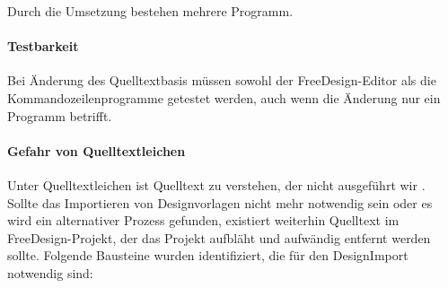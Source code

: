 Durch die Umsetzung bestehen mehrere Programm.
\paragraph{Testbarkeit} 
Bei Änderung des Quelltextbasis müssen sowohl der FreeDesign-Editor als die Kommandozeilenprogramme getestet werden, auch wenn die Änderung nur ein Programm betrifft.
\paragraph{Gefahr von Quelltextleichen}
Unter Quelltextleichen ist Quelltext zu verstehen, der nicht ausgeführt wir \autocite[vgl.][292]{Martin2009}. Sollte das Importieren von Designvorlagen nicht mehr notwendig sein oder es wird ein alternativer Prozess gefunden, existiert weiterhin Quelltext im FreeDesign-Projekt, der das Projekt aufbläht und aufwändig entfernt werden sollte.
\newline
Folgende Bausteine wurden identifiziert, die für den DesignImport notwendig sind: 

\begin{multicols}{2}    
    
\end{multicols}